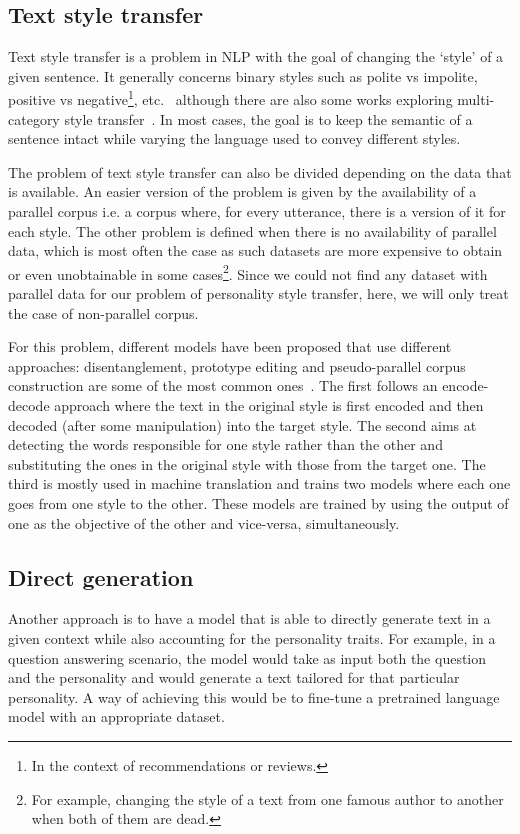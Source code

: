 \documentclass[nomenclature, english, biblatex]{kththesis}
\begin{document}
\subsection{Text style transfer}
\label{sec:styletransfer}
Text style transfer is a problem in \gls{NLP} with the goal of changing the `style' of a given sentence. It generally concerns binary styles such as polite vs impolite, positive vs negative\footnote{In the context of recommendations or reviews.}, etc.~\cite{jin2021deep} although there are also some works exploring multi-category style transfer~\cite{gan2017stylenet, krishna2020reformulating}. In most cases, the goal is to keep the semantic of a sentence intact while varying the language used to convey different styles. 

The problem of text style transfer can also be divided depending on the data that is available. An easier version of the problem is given by the availability of a parallel corpus i.e. a corpus where, for every utterance, there is a version of it for each style. The other problem is defined when there is no availability of parallel data, which is most often the case as such datasets are more expensive to obtain or even unobtainable in some cases\footnote{For example, changing the style of a text from one famous author to another when both of them are dead.}. Since we could not find any dataset with parallel data for our problem of personality style transfer, here, we will only treat the case of non-parallel corpus.

For this problem, different models have been proposed that use different approaches: disentanglement, prototype editing and pseudo-parallel corpus construction are some of the most common ones~\cite{jin2021deep}. The first follows an encode-decode approach where the text in the original style is first encoded and then decoded (after some manipulation) into the target style. The second aims at detecting the words responsible for one style rather than the other and substituting the ones in the original style with those from the target one. The third is mostly used in machine translation and trains two models where each one goes from one style to the other. These models are trained by using the output of one as the objective of the other and vice-versa, simultaneously.
\subsection{Direct generation}
Another approach is to have a model that is able to directly generate text in a given context while also accounting for the personality traits. For example, in a question answering scenario, the model would take as input both the question and the personality and would generate a text tailored for that particular personality. A way of achieving this would be to fine-tune a pretrained language model with an appropriate dataset.
\end{document}
